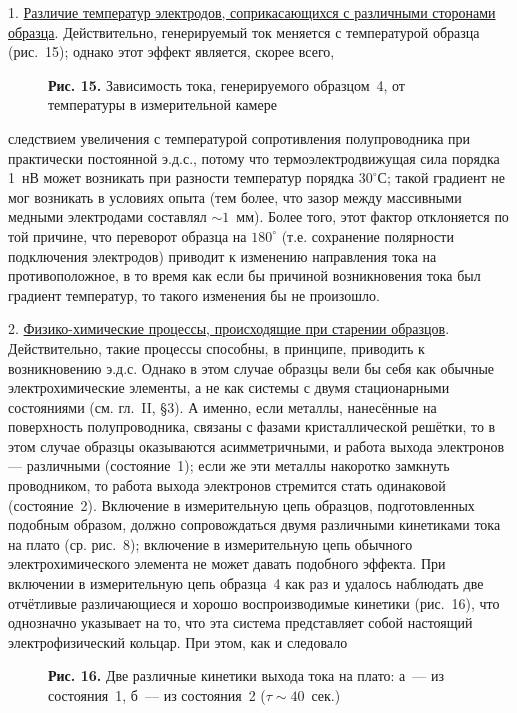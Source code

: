 \documentclass[12pt,a4paper]{article}
\begin{document}
1. \underline{Различие температур электродов, соприкасающихся с различными
сторонами образца}. Действительно, генерируемый ток меняется с температурой
образца (рис.~15); однако этот эффект является, скорее всего,

\begin{figure}[h]
\centering
\caption*{\textbf{Рис. 15.} Зависимость тока, генерируемого образцом~4, от
температуры в измерительной камере}
\end{figure}

\newpage

следствием увеличения с температурой сопротивления полупроводника при
практически постоянной э.д.с., потому что термоэлектродвижущая сила порядка
1~нВ может возникать при разности температур порядка $30^{\circ}$С; такой
градиент не мог возникать в условиях опыта (тем более, что зазор между
массивными медными электродами составлял $\sim 1$~мм). Более того, этот фактор
отклоняется по той причине, что переворот образца на $180^{\circ}$ (т.е.
сохранение полярности подключения электродов) приводит к изменению направления
тока на противоположное, в то время как если бы причиной возникновения тока
был градиент температур, то такого изменения бы не произошло.

2. \underline{Физико-химические процессы, происходящие при старении образцов}.
Действительно, такие процессы способны, в принципе, приводить к возникновению
э.д.с. Однако в этом случае образцы вели бы себя как обычные электрохимические
элементы, а не как системы с двумя стационарными состояниями (см. гл.~II, §3).
А именно, если металлы, нанесённые на поверхность полупроводника, связаны с
фазами кристаллической решётки, то в этом случае образцы оказываются
асимметричными, и работа выхода электронов — различными (состояние~1); если
же эти металлы накоротко замкнуть проводником, то работа выхода электронов
стремится стать одинаковой (состояние~2). Включение в измерительную цепь
образцов, подготовленных подобным образом, должно сопровождаться двумя
различными кинетиками тока на плато (ср. рис.~8); включение в измерительную
цепь обычного электрохимического элемента не может давать подобного эффекта.
При включении в измерительную цепь образца~4 как раз и удалось наблюдать две
отчётливые различающиеся и хорошо воспроизводимые кинетики (рис.~16), что
однозначно указывает на то, что эта система представляет собой настоящий
электрофизический кольцар. При этом, как и следовало

\begin{figure}[h]
\centering
\caption*{\textbf{Рис. 16.} Две различные кинетики выхода тока на плато:
а~— из состояния~1, б~— из состояния~2 ($\tau \sim 40$~сек.)}
\end{figure}
\end{document}
